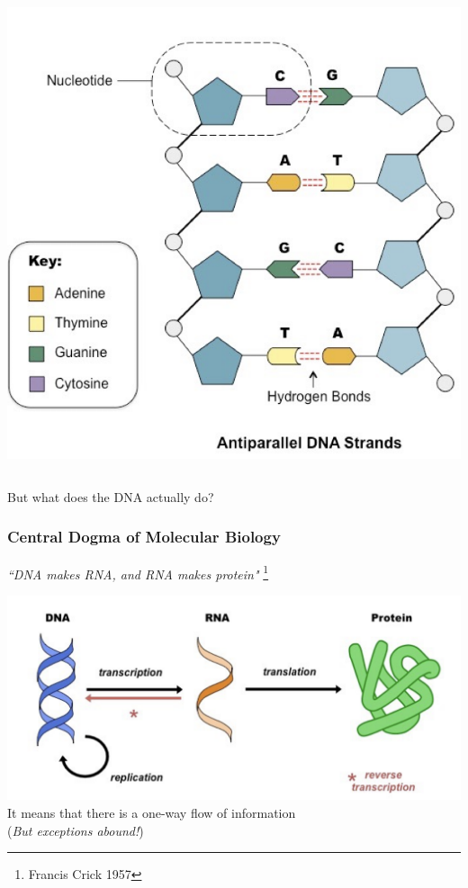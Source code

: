 \documentclass{beamer}
\newcommand\blfootnote[1]{%
	\begingroup
	\renewcommand\thefootnote{}\footnote{#1}%
	\addtocounter{footnote}{-1}%
	\endgroup
}
\begin{document}
\begin{frame}
\begin{columns}
\begin{column}{0.33\textwidth}
			\centering	\includegraphics[keepaspectratio, width  = \textwidth]{img/DNA_cartoon}\\ 
	\end{column}
	\end{columns}
	
\centering	\Large But what does the DNA actually do?
\end{frame}



\begin{frame}
	\frametitle{Central Dogma of Molecular Biology}
	
	
	\centering	\Large \textit{``DNA makes RNA, and RNA makes protein"} \blfootnote{Francis Crick 1957}
	
				\centering	\includegraphics[keepaspectratio, width  = \textwidth]{img/dogma}\\ 
	
	\scriptsize \centering	It means that there is a one-way flow of information \\(\textit{But exceptions abound!})
	
\end{frame}
\end{document}
